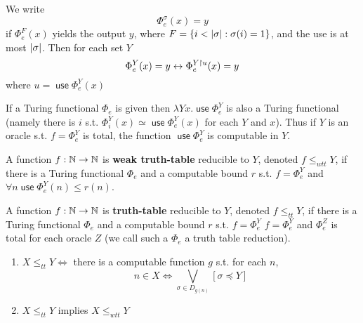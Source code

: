 \documentclass[11pt]{article}
\DeclareMathOperator{\use}{\textsf{use}}
\begin{document}
We write
\begin{equation*}
\Phi_e^\sigma(x)=y
\end{equation*}
if \(\Phi_e^F(x)\) yields the output \(y\), where \(F=\{i<\abs{\sigma}:\sigma(i)=1\}\), and the use is at
most \(\abs{\sigma}\). Then for each set \(Y\)
\begin{equation*}
\Phi_e^Y(x)=y\leftrightarrow\Phi_e^{Y\upharpoonright u}(x)=y
\end{equation*}
where \(u=\use\Phi_e^Y(x)\)

If a Turing functional \(\Phi_e\) is given then \(\lambda Yx.\use\Phi_e^Y\) is also a Turing functional
(namely there is \(i\) s.t. \(\Phi_i^Y(x)\simeq\use\Phi_e^Y(x)\) for each \(Y\) and \(x\)). Thus if \(Y\)
is an oracle s.t. \(f=\Phi_e^Y\) is total, the function \(\use\Phi_e^Y\) is computable in \(Y\).

\begin{definition}[]
A function \(f:\mathbb{N}\to\mathbb{N}\) is \textbf{weak truth-table} reducible to \(Y\), denoted \(f\le_{wtt}Y\), if there is
a Turing functional \(\Phi_e\) and a computable bound \(r\) s.t. \(f=\Phi_e^Y\)
and \(\forall n\use\Phi_e^Y(n)\le r(n)\).
\end{definition}

\begin{definition}[]
A function \(f:\mathbb{N}\to\mathbb{N}\) is \textbf{truth-table} reducible to \(Y\), denoted \(f\le_{tt}Y\), if there is
a Turing functional \(\Phi_e\) and a computable bound \(r\) s.t. \(f=\Phi_e^Y\)
\(f=\Phi_e^Y\) and \(\Phi_e^Z\) is total for each oracle \(Z\) (we call such a \(\Phi_e\) a truth table reduction).
\end{definition}

\begin{proposition}[]
\begin{enumerate}
\item \(X\le_{tt}Y\Leftrightarrow\) there is a computable function \(g\) s.t. for each \(n\),
\begin{equation*}
n\in X\Leftrightarrow\bigvee_{\sigma\in D_{g(n)}}[\sigma\preceq Y]
\end{equation*}
\item \(X\le_{tt}Y\) implies \(X\le_{wtt}Y\)
\end{enumerate}
\end{proposition}
\end{document}
